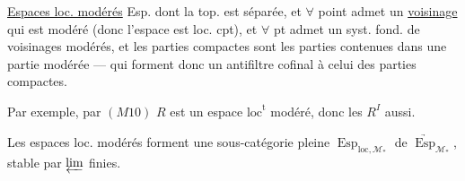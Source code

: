 \uline{Espaces loc. modérés} Esp.   dont la top. est  séparée, et $\forall$ point admet un \uline{voisinage} qui est  modéré (donc l'espace est loc. cpt), et $\forall$ pt admet un syst. fond. de voisinages modérés, et les parties compactes sont les parties contenues dans une partie modérée --- qui forment donc un antifiltre cofinal à celui des parties compactes.

Par exemple, par $(M10)$ $R$ est un espace $\mathrm{loc}^{\mathrm t}$ modéré, donc les $R^I$ aussi.

Les espaces loc. modérés  forment une sous-catégorie pleine $\operatorname{Esp}_{\mathrm{loc},\mathcal M_*}$ de $\underrightarrow{\operatorname{Esp}}_{\mathcal M_*}$, stable par $\varprojlim$ finies.

